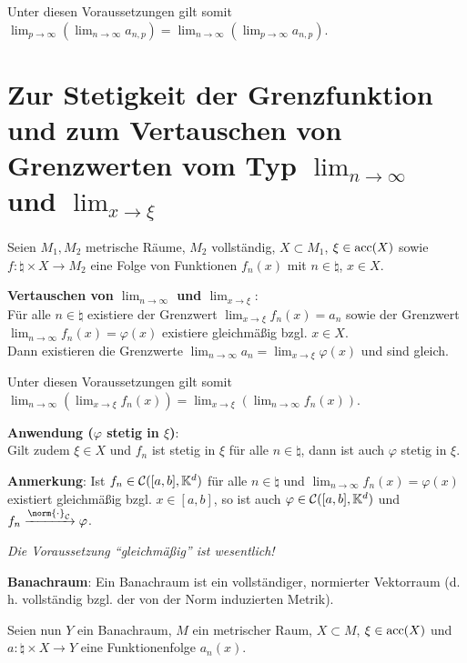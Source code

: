 Unter diesen Voraussetzungen gilt somit
$\lim_{p \to \infty} (\lim_{n \to \infty} a_{n,p}) =
\lim_{n \to \infty} (\lim_{p \to \infty} a_{n,p})$.

\section{%
    Zur Stetigkeit der Grenzfunktion und
    zum Vertauschen von Grenzwerten vom Typ
    \texorpdfstring
    {$\lim_{n \to \infty}$ und $\lim_{x \to \xi}$}%
    {n → ∞ und ξ → ∞}%
}

Seien $M_1, M_2$ metrische Räume, $M_2$ vollständig, $X \subset M_1$,
$\xi \in \operatorname{acc}(X)$ sowie $f: \natural \times X \rightarrow M_2$
eine Folge von Funktionen $f_n(x)$ mit $n \in \natural$, $x \in X$.

\textbf{Vertauschen von $\lim_{n \to \infty}$ und $\lim_{x \to \xi}$}: \\
Für alle $n \in \natural$ existiere der Grenzwert
$\lim_{x \to \xi} f_n(x) = a_n$
sowie der Grenzwert \\
$\lim_{n \to \infty} f_n(x) = \varphi(x)$ existiere
gleichmäßig bzgl. $x \in X$. \\
Dann existieren die Grenzwerte
$\lim_{n \to \infty} a_n = \lim_{x \to \xi} \varphi(x)$ und sind gleich.

Unter diesen Voraussetzungen gilt somit
$\lim_{n \to \infty} \left(\lim_{x \to \xi} f_n(x)\right) =
\lim_{x \to \xi} \left(\lim_{n \to \infty} f_n(x)\right)$.

\linie

\textbf{Anwendung ($\varphi$ stetig in $\xi$)}: \\
Gilt zudem $\xi \in X$ und $f_n$ ist stetig in $\xi$ für alle
$n \in \natural$, dann ist auch $\varphi$ stetig in $\xi$.

\textbf{Anmerkung}: Ist $f_n \in \mathcal{C}([a,b], \mathbb{K}^d)$ für alle
$n \in \natural$ und $\lim_{n \to \infty} f_n(x) = \varphi(x)$ existiert
gleichmäßig bzgl. $x \in [a,b]$, so ist auch
$\varphi \in \mathcal{C}([a,b], \mathbb{K}^d)$ und
$f_n \xrightarrow{\norm{\cdot}_\C} \varphi$.

\emph{Die Voraussetzung "`gleichmäßig"' ist wesentlich!}

\linie

\textbf{Banachraum}: Ein Banachraum ist ein vollständiger, normierter
Vektorraum (d.\,h. vollständig bzgl. der von der Norm induzierten Metrik).

Seien nun $Y$ ein Banachraum, $M$ ein metrischer Raum, $X \subset M$,
$\xi \in \operatorname{acc}(X)$ und $a: \natural \times X \rightarrow Y$ eine
Funktionenfolge $a_n(x)$.

